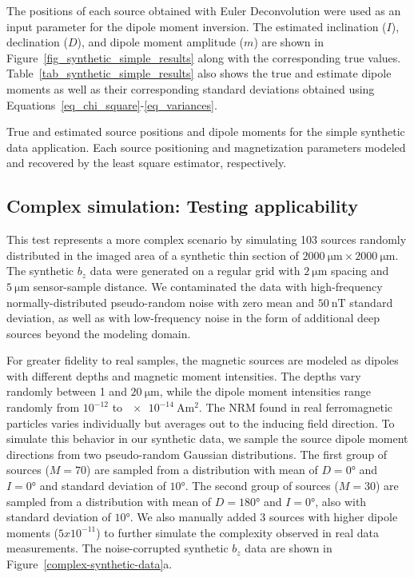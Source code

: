 The positions of each source obtained with Euler Deconvolution were used as an input parameter for the dipole moment inversion.
The estimated inclination ($I$), declination ($D$), and dipole moment amplitude ($m$) are shown in Figure~\ref{fig_synthetic_simple_results} along with the corresponding true values.
Table~\ref{tab_synthetic_simple_results} also shows the true and estimate dipole moments as well as their corresponding standard deviations obtained using Equations~\ref{eq_chi_square}-\ref{eq_variances}.

\begin{table}[tb]
  \begin{center}
    \small
    
  \end{center}
  \caption{
  True and estimated source positions and dipole moments for the simple synthetic data application.
  Each source positioning and magnetization parameters modeled and recovered by the least square estimator, respectively.}
  \label{tab_synthetic_simple_results}
\end{table}


\subsection{Complex simulation: Testing applicability}

This test represents a more complex scenario by simulating 103 sources randomly distributed in the imaged area of a synthetic thin section of $\qty{2000}{\um} \times \qty{2000}{\um}$.
The synthetic $b_z$ data were generated on a regular grid with $\qty{2}{\um}$ spacing and $\qty{5}{\um}$ sensor-sample distance.
We contaminated the data with high-frequency normally-distributed pseudo-random noise with zero mean and $\qty{50}{\nano\tesla}$ standard deviation, as well as with low-frequency noise in the form of additional deep sources beyond the modeling domain.

For greater fidelity to real samples, the magnetic sources are modeled as dipoles with different depths and magnetic moment intensities.
The depths vary randomly between 1 and $\qty{20}{\um}$, while the dipole moment intensities range randomly from $10^{-12}$ to $\qty{e-14}{\ampere\m\squared}$.
The NRM found in real ferromagnetic particles varies individually but averages out to the inducing field direction.
To simulate this behavior in our synthetic data, we sample the source dipole moment directions from two pseudo-random Gaussian distributions.
The first group of sources ($M = 70$) are sampled from a distribution  with mean of $D = \ang{0}$ and $I = \ang{0}$ and standard deviation of $\ang{10}$.
The second group of sources ($M = 30$) are sampled from a distribution with mean of $D = \ang{180}$ and $I = \ang{0}$, also with standard deviation of $\ang{10}$. We also manually added 3 sources with higher dipole moments ($5x10^{-11}$) to further simulate the complexity observed in real data measurements. The noise-corrupted synthetic $b_z$ data are shown in Figure~\ref{complex-synthetic-data}a.

